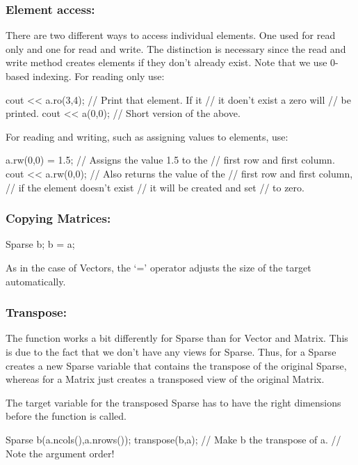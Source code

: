 \subsubsection{Element access:}
There are two different ways to access individual elements. One used for
read only and one for read and write. The distinction is necessary since
the read and write method creates elements if they don't already exist.
Note that we use 0-based indexing. For reading only use:
\begin{code}
cout << a.ro(3,4);  // Print that element. If it
                    // it doen't exist a zero will
                    // be printed.
cout << a(0,0);     // Short version of the above.
\end{code}

For reading and writing, such as assigning values to elements, use:
\begin{code}
a.rw(0,0) = 1.5;    // Assigns the value 1.5 to the
                    // first row and first column.
cout << a.rw(0,0);  // Also returns the value of the
                    // first row and first column,
                    // if the element doesn't exist
                    // it will be created and set
                    // to zero.
\end{code}

\subsubsection{Copying Matrices:}
\begin{code}
Sparse b;
b = a;
\end{code}

As in the case of Vectors, the `=' operator adjusts the size of the
target automatically.

\subsubsection{Transpose:} The function  works a bit
differently for Sparse than for Vector and Matrix. This is due to the
fact that we don't have any views for Sparse. Thus,
 for a Sparse creates a new Sparse variable that
contains the transpose of the original Sparse, whereas
 for a Matrix just creates a transposed view of
the original Matrix.

The target variable for the transposed Sparse has to have the right
dimensions before the function is called.
\begin{code}
Sparse b(a.ncols(),a.nrows());
transpose(b,a);     // Make b the transpose of a.
                    // Note the argument order!
\end{code}

